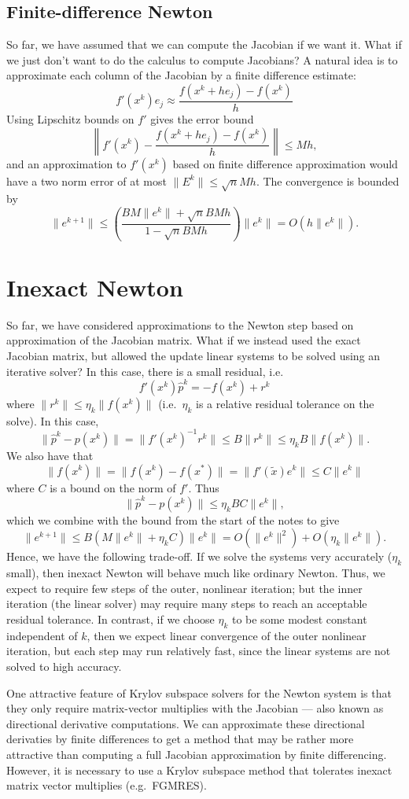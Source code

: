 \documentclass[12pt, leqno]{article} %
\begin{document}
\subsection{Finite-difference Newton}

So far, we have assumed that we can compute the Jacobian if we want
it.  What if we just don't want to do the calculus to compute
Jacobians?  A natural idea is to approximate each column of the
Jacobian by a finite difference estimate:
\[
  f'(x^k) e_j \approx \frac{f(x^k+he_j)-f(x^k)}{h}
\]
Using Lipschitz bounds on $f'$ gives the error bound
\[
  \left\| f'(x^k) - \frac{f(x^k+he_j)-f(x^k)}{h} \right\| \leq Mh,
\]
and an approximation to $f'(x^k)$ based on finite difference
approximation would have a two norm error of at most
$\|E^k\| \leq \sqrt{n} M h$.  The convergence is bounded by
\[
  \|e^{k+1}\| \leq
  \left( \frac{BM\|e^k\| + \sqrt{n}BMh}{1-\sqrt{n} BMh} \right) \|e^k\| =
  O(h\|e^k\|).
\]

\section{Inexact Newton}

So far, we have considered approximations to the Newton step based on
approximation of the Jacobian matrix.  What if we instead used the
exact Jacobian matrix, but allowed the update linear systems to be solved
using an iterative solver?  In this case, there is a small residual,
i.e.
\[
  f'(x^k) \hat{p}^k = -f(x^k) + r^k
\]
where $\|r^k\| \leq \eta_k \|f(x^k)\|$ (i.e.~$\eta_k$ is a relative
residual tolerance on the solve).  In this case,
\[
  \|\hat{p}^k-p(x^k)\| = \|f'(x^k)^{-1} r^k\| \leq B \|r^k\| \leq
  \eta_k B \|f(x^k)\|.
\]
We also have that
\[
  \|f(x^k)\| = \|f(x^k)-f(x^*)\| = \|f'(\tilde{x}) e^k\| \leq C \|e^k\|
\]
where $C$ is a bound on the norm of $f'$.  Thus
\[
  \|\hat{p}^k-p(x^k)\| \leq \eta_k BC \|e^k\|,
\]
which we combine with the bound from the start of the notes to give
\[
\|e^{k+1}\| \leq B(M \|e^k\| + \eta_k C) \|e^k\|
  = O(\|e^k\|^2) + O(\eta_k \|e^k\|).
\]
Hence, we have the following trade-off.  If we solve the systems very
accurately ($\eta_k$ small), then inexact Newton will behave much
like ordinary Newton.  Thus, we expect to require few steps of the
outer, nonlinear iteration; but the inner iteration (the linear
solver) may require many steps to reach an acceptable residual
tolerance.  In contrast, if we choose $\eta_k$ to be some modest
constant independent of $k$, then we expect linear convergence of the
outer nonlinear iteration, but each step may run relatively fast,
since the linear systems are not solved to high accuracy.

One attractive feature of Krylov subspace solvers for the Newton
system is that they only require matrix-vector multiplies with
the Jacobian --- also known as directional derivative computations.
We can approximate these directional derivaties by finite differences
to get a method that may be rather more attractive than computing
a full Jacobian approximation by finite differencing.  However,
it is necessary to use a Krylov subspace method that tolerates inexact
matrix vector multiplies (e.g.~FGMRES).
\end{document}
